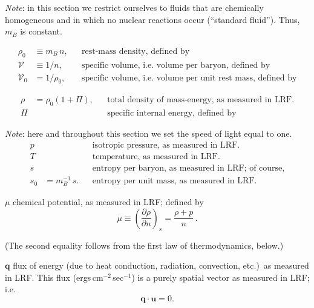\textit{Note}: in this section we restrict ourselves to fluids that are chemically
homogeneous and in which no nuclear reactions occur (``standard
fluid'').  Thus, $m_B$ is constant.

\begin{align}
\rho_0 &\equiv m_B\,n, && \text{rest-mass density, defined by}
\tag{2.5.2} \\[4pt]
\mathcal{V} &\equiv 1/n, && \text{specific volume, i.e.\ volume per baryon, defined by}
\tag{2.5.3} \\[4pt]
\mathcal{V}_0 &= 1/\rho_0, && \text{specific volume, i.e.\ volume per unit rest mass, defined by}
\tag{2.5.4}
\end{align}

\begin{align}
\rho &= \rho_0(1 + \Pi), && \text{total density of mass-energy, as measured in LRF.}
\tag{2.5.5}\\[4pt]
\Pi &\quad && \text{specific internal energy, defined by}
\tag*{}
\end{align}

\textit{Note}: here and throughout this section we set the speed of light equal to
one.
\begin{align}
p  &\quad && \text{isotropic pressure, as measured in LRF.}
\tag*{} \\
T  &\quad && \text{temperature, as measured in LRF.}
\tag*{} \\
s  &\quad && \text{entropy per baryon, as measured in LRF; of course,}
\tag*{} \\
s_0 &= m_B^{-1}\,s. && \text{entropy per unit mass, as measured in LRF.}
\tag{2.5.6}
\end{align}

$\mu$ \quad chemical potential, as measured in LRF; defined by
%
\begin{equation}
\tag{2.5.7}
\mu \equiv \left(\frac{\partial\rho}{\partial n}\right)_{\!s}
  = \frac{\rho + p}{n}\,.
\end{equation}

(The second equality follows from the first law of thermodynamics,
below.)

\medskip
\noindent
$\mathbf{q}$ \quad flux of energy (due to heat conduction, radiation,
convection, etc.)\ as measured in LRF.  This flux
(ergs\,cm$^{-2}$\,sec$^{-1}$) is a purely spatial vector as measured
in LRF; i.e.
%
\begin{equation}
\tag{2.5.8}
\mathbf{q} \cdot \mathbf{u} = 0.
\end{equation}

